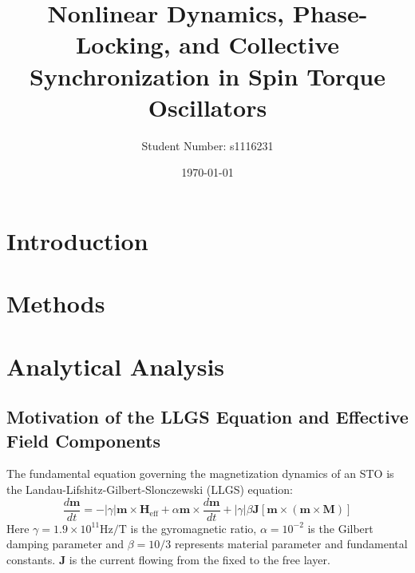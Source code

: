 \documentclass[reprint,amsmath,amssymb,aps, floatfix]{revtex4-2}
\begin{document}
\raggedbottom

\title{Nonlinear Dynamics, Phase-Locking, and Collective Synchronization in Spin Torque Oscillators}
\author{Student Number: s1116231}
\date{\today}

\begin{abstract}

\end{abstract}

\maketitle

\begin{widetext}
    \newpage
    \tableofcontents
    \newpage
\end{widetext}

\section{Introduction}

\section{Methods}

\section{Analytical Analysis}
\subsection{Motivation of the LLGS Equation and Effective Field Components}
The fundamental equation governing the magnetization dynamics of an STO is the Landau-Lifshitz-Gilbert-Slonczewski (LLGS) equation:
\begin{equation}
    \frac{d\mathbf{m}}{dt} = -\left|\gamma\right|\mathbf{m} \times \mathbf{H}_{\text{eff}} + \alpha \mathbf{m} \times \frac{d\mathbf{m}}{dt} + \left|\gamma\right|\beta \mathbf{J} \left[ \mathbf{m} \times \left(\mathbf{m}\times\mathbf{M}\right) \right]
\end{equation}
Here $\gamma = 1.9 \times 10^{11}\text{Hz/T}$ is the gyromagnetic ratio, $\alpha = 10^{-2}$ is the Gilbert damping parameter and $\beta = 10\text{/}3$ represents material parameter and fundamental constants.
$\mathbf{J}$ is the current flowing from the fixed to the free layer.
\end{document}
